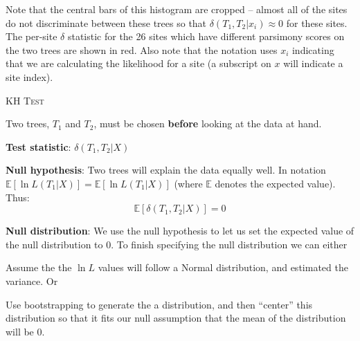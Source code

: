 \documentclass[11pt]{article}
\renewcommand{\section}[2]{%
\bigskip
\begin{center}
\begin{Large}
\normalfont\scshape #2
\medskip
\end{Large}
\end{center}}
\renewcommand{\subsubsection}[1]{%
\noindent\textbf{#1}:}
\newcommand{\lnL}{\ln L}
\newcommand{\expectation}{{\mathbb{E}}}
\newcommand{\expect}[1]{\expectation\left[#1\right]}
\begin{document}
Note that the central bars of this histogram are cropped -- almost all of the sites do not discriminate between these trees so that $\delta(T_1,T_2|x_i)\approx0$ for these sites.
The per-site $\delta$ statistic for the 26 sites which have different parsimony scores on the two trees are shown in red.
Also note that the notation uses $x_i$ indicating that we are calculating the likelihood for a site (a subscript on $x$ will indicate a site index).

\newpage
\section*{KH Test \citep{KishinoH1989} }
Two trees, $T_1$ and $T_2$, must be chosen {\bf before} looking at the data at hand.

\subsubsection{Test statistic} $\delta(T_1,T_2|X)$

\subsubsection{Null hypothesis} Two trees will explain the data equally well. 
In notation $\expect{\lnL(T_1|X)} = \expect{\lnL(T_1|X)}$ (where $\expectation$ denotes the expected value).  Thus:
$$\expect{\delta(T_1,T_2|X)} = 0$$

\subsubsection{Null distribution} We use the null hypothesis to let us set the expected value of the null distribution to 0.
To finish specifying the null distribution we can either
\begin{compactenum}
	\item Assume the the $\lnL$ values will follow a Normal distribution, and estimated the variance. Or
	\item Use bootstrapping to generate the a distribution, and then ``center'' this distribution so that it fits our null assumption that the mean of the distribution will be 0.
\end{compactenum}
\end{document}
